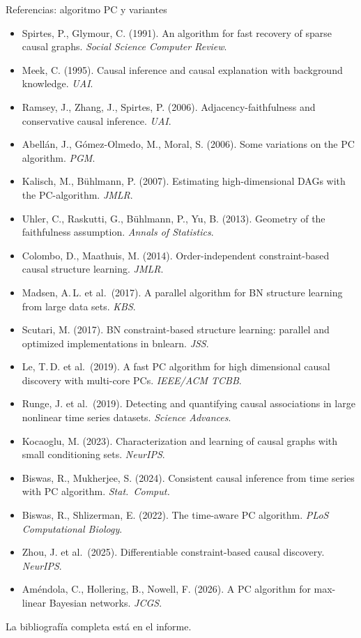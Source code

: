 \documentclass[aspectratio=169,11pt]{beamer}
\begin{document}
\begin{frame}[t]{Referencias: algoritmo PC y variantes}
  \scriptsize
  \begin{itemize}\setlength{\itemsep}{1pt}
    \item Spirtes, P., Glymour, C. (1991). An algorithm for fast recovery of sparse causal graphs. \emph{Social Science Computer Review}.
    \item Meek, C. (1995). Causal inference and causal explanation with background knowledge. \emph{UAI}.
    \item Ramsey, J., Zhang, J., Spirtes, P. (2006). Adjacency-faithfulness and conservative causal inference. \emph{UAI}.
    \item Abellán, J., Gómez-Olmedo, M., Moral, S. (2006). Some variations on the PC algorithm. \emph{PGM}.
    \item Kalisch, M., Bühlmann, P. (2007). Estimating high-dimensional DAGs with the PC-algorithm. \emph{JMLR}.
    \item Uhler, C., Raskutti, G., Bühlmann, P., Yu, B. (2013). Geometry of the faithfulness assumption. \emph{Annals of Statistics}.
    \item Colombo, D., Maathuis, M. (2014). Order-independent constraint-based causal structure learning. \emph{JMLR}.
    \item Madsen, A.\,L. et al.\ (2017). A parallel algorithm for BN structure learning from large data sets. \emph{KBS}.
    \item Scutari, M. (2017). BN constraint-based structure learning: parallel and optimized implementations in bnlearn. \emph{JSS}.
    \item Le, T.\,D. et al.\ (2019). A fast PC algorithm for high dimensional causal discovery with multi-core PCs. \emph{IEEE/ACM TCBB}.
    \item Runge, J. et al.\ (2019). Detecting and quantifying causal associations in large nonlinear time series datasets. \emph{Science Advances}.
    \item Kocaoglu, M. (2023). Characterization and learning of causal graphs with small conditioning sets. \emph{NeurIPS}.
    \item Biswas, R., Mukherjee, S. (2024). Consistent causal inference from time series with PC algorithm. \emph{Stat.\ Comput.}
    \item Biswas, R., Shlizerman, E. (2022). The time-aware PC algorithm. \emph{PLoS Computational Biology}.
    \item Zhou, J. et al.\ (2025). Differentiable constraint-based causal discovery. \emph{NeurIPS}.
    \item Améndola, C., Hollering, B., Nowell, F. (2026). A PC algorithm for max-linear Bayesian networks. \emph{JCGS}.
  \end{itemize}
  \vfill
  {\scriptsize\color{upmgray}La bibliografía completa está en el informe.}
\end{frame}
\end{document}
